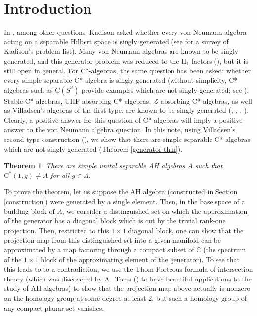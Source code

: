 \documentclass[12pt, oneside, psamsfonts]{amsart}
\newtheorem{thm}{Theorem}[section]
\theoremstyle{definition}
\theoremstyle{remark}
\numberwithin{equation}{section}
\newcommand{\Comp}{\mathbb C}
\begin{document}
\section{Introduction}
In \cite{Kadison-list}, among other questions, Kadison asked whether every von Neumann algebra acting on a separable Hilbert space is singly generated (see \cite{Ge_2003} for a survey of Kadison's problem list). Many von Neumann algebras are known to be singly generated, and this generator problem was reduced to the $\mathrm{II}_1$ factors (\cite{Willig_1974}), but it is still open in general. For C*-algebras, the same question has been asked: whether every simple separable C*-algebra is singly generated (without simplicity, C*-algebras such as $\mathrm{C}(S^2)$ provide examples which are not singly generated; see \cite{Nagisa-04}). Stable C*-algebras, UHF-absorbing C*-algebras, $\mathcal Z$-absorbing C*-algebras, as well as Villadsen's algebras of the first type, are known to be singly generated (\cite{Topping_1968}, \cite{Olsen_1976}, \cite{Li-Sh-AD}, \cite{Thiel-Winter-14} \cite{LNR-26}). Clearly, a positive answer for this question of C*-algebras  will imply a positive answer to the von Neumann algebra question. In this note, using Villadsen's second type construction (\cite{Vill-sr}), we show that there are simple separable C*-algebras which are not singly generated (Theorem \ref{generator-thm}). 
\begin{thm}
There are simple unital separable AH algebras $A$ such that $\mathrm{C^*}(1, g) \neq A$ for all $g \in A$. 
\end{thm}

To prove the theorem, let us suppose the AH algebra (constructed in Section \ref{construction}) were generated by a single element. Then, in the base space of a building block of $A$, we consider a distinguished set on which the approximation of the generator has a diagonal block which is cut by the trivial rank-one projection. Then, restricted to this $1 \times 1$ diagonal block, one can show that the projection map from this distinguished set into a given manifold can be approximated by a map factoring through a compact subset of $\Comp$ (the spectrum of the $1 \times 1$ block of the approximating element of the generator). To see that this leads to to a contradiction, we use the Thom-Porteous formula of intersection theory (which was discovered by A.~Toms (\cite{Toms-26}) to have beautiful applications to the study of AH algebras) to show that the projection map above actually is nonzero on the homology group at some degree at least $2$, but such  a homology group of any compact planar set vanishes.
\end{document}
